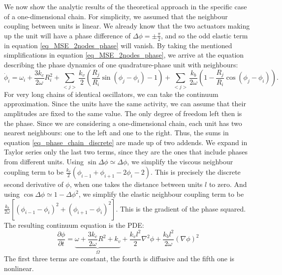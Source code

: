 \documentclass[11pt, a4paper]{article} %
\begin{document}
We now show the analytic results of the theoretical approach in the specific case of a one-dimensional chain. 
For simplicity, we assumed that the neighbour coupling between units is linear.
We already know that the two actuators making up the unit will have a phase difference of $\Delta\phi=\pm\frac{\pi}{2}$, 
and so the odd elastic term in equation \eqref{eq_MSE_2nodes_phase} will vanish. 
By taking the mentioned simplifications in equation \eqref{eq_MSE_2nodes_phase}, we arrive at
the equation describing the phase dynamics of one quadrature-phase unit with neighbours:
\begin{equation}
    \dot{\phi}_i =  \omega_i + \frac{3k_{c}}{2\omega} R_i^2 + \sum_{<j>} \frac{k_v}{2}\left(\frac{R_j}{R_i}\sin{(\phi_j - \phi_i)} - 1\right) 
    + \sum_{<j>} \frac{k_b}{2\omega}\left(1 - \frac{R_j}{R_i}\cos{(\phi_j - \phi_i)}\right).
    \label{eq_phase_chain_discrete}
\end{equation}
For very long chains of identical oscillators, we can take the continuum approximation. Since the units have the 
same activity, we can assume that their amplitudes are fixed to the same value. The only degree of freedom left then 
is the phase. Since we are considering a one-dimensional chain, each unit has two nearest neighbours: one to the left and one to the right.
Thus, the sums in equation \eqref{eq_phase_chain_discrete} are made up of two addends. 
We expand in Taylor series only the last two terms, since they are the ones that include phases from different units. 
Using $\sin{\Delta\phi}\simeq \Delta\phi$, we simplify the viscous neighbour coupling term to be
$ \frac{k_v}{2}\left(\phi_{i-1} + \phi_{i+1} - 2\phi_i - 2\right)$. This is precisely the 
discrete second derivative of $\phi$, when one takes the distance between units $l$ to zero.
And using $\cos{\Delta\phi}\simeq 1 - \Delta\phi ^2$, we simplify the elastic neighbour coupling term to be 
$\frac{k_b}{2\omega}\left[(\phi_{i-1} - \phi_i)^2 + (\phi_{i+1} - \phi_i)^2\right]$. This is the gradient of the phase squared. 
The resulting continuum equation is the PDE:
\begin{equation}
    \frac{\partial \phi}{\partial t} = \underbrace{\omega + \frac{3k_{c}}{2\omega} R^2 + k_v}_{\Omega} + \frac{k_vl^2}{2}\nabla^2 \phi 
    + \frac{k_bl^2}{2\omega}\left(\nabla\phi\right)^2
    \label{eq_KPZ_phase_identical}
\end{equation}
The first three terms are constant, the fourth is diffusive and the fifth one is nonlinear. 
\end{document}
